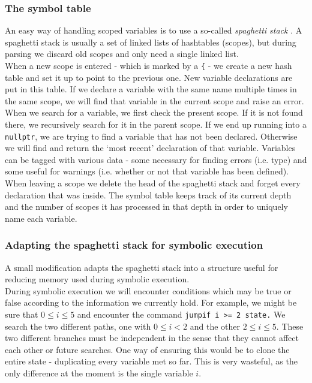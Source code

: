 \documentclass[12pt,a4paper]{article}
\begin{document}
\subsubsection{The symbol table}
An easy way of handling scoped variables is to use a so-called \textit{spaghetti stack} \citep{dragon}. A spaghetti stack is usually a set of linked lists of hashtables (scopes), but during parsing we discard old scopes and only need a single linked list.\\
When a new scope is entered - which is marked by a \texttt{\{} - we create a new hash table and set it up to point to the previous one. New variable declarations are put in this table. If we declare a variable with the same name multiple times in the same scope, we will find that variable in the current scope and raise an error.\\
When we search for a variable, we first check the present scope. If it is not found there, we recursively search for it in the parent scope. If we end up running into a \texttt{nullptr}, we are trying to find a variable that has not been declared. Otherwise we will find and return the `most recent' declaration of that variable. Variables can be tagged with various data - some necessary for finding errors (i.e. type) and some useful for warnings (i.e. whether or not that variable has been defined).\\
When leaving a scope we delete the head of the spaghetti stack and forget every declaration that was inside. The symbol table keeps track of its current depth and the number of scopes it has processed in that depth in order to uniquely name each variable.

\subsubsection{Adapting the spaghetti stack for symbolic execution}
A small modification adapts the spaghetti stack into a structure useful for reducing memory used during symbolic execution.\\
During symbolic execution we will encounter conditions which may be true or false according to the information we currently hold. For example, we might be sure that $0 \leq i \leq 5$ and encounter the command \texttt{jumpif i >= 2 state.} We search the two different paths, one with $0 \leq i < 2$ and the other $2 \leq i \leq 5$. These two different branches must be independent in the sense that they cannot affect each other or future searches. One way of ensuring this would be to clone the entire state - duplicating every variable met so far. This is very wasteful, as the only difference at the moment is the single variable $i$.\par
\end{document}
